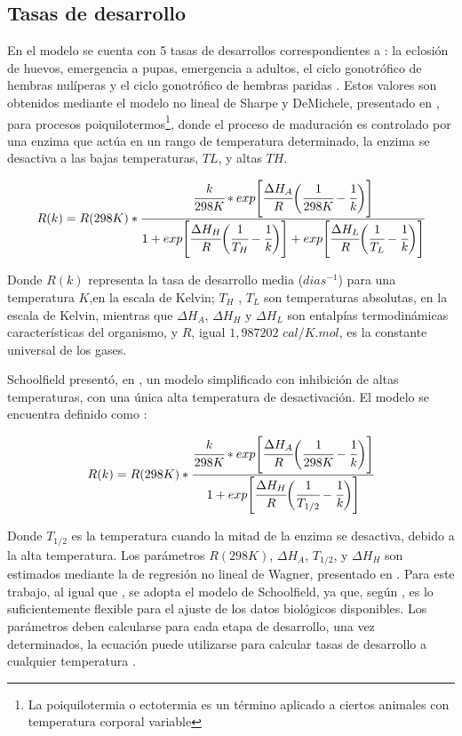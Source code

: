 \subsection{Tasas de desarrollo}
\label{subsec:cap4-tasas de desarrollo}
En el modelo se cuenta con 5 tasas de desarrollos correspondientes a : la eclosión de huevos,
emergencia a pupas, emergencia a adultos, el ciclo gonotrófico de hembras nulíperas y el ciclo gonotrófico de hembras paridas . Estos valores son obtenidos mediante el modelo no lineal de
Sharpe y DeMichele, presentado en \cite{sharpe1977reaction}, para procesos poiquilotermos\footnote{ La poiquilotermia o ectotermia es un término aplicado a ciertos animales con temperatura corporal
variable}, donde el proceso de maduración es controlado por una enzima que actúa en un rango de temperatura determinado, la enzima se desactiva a las bajas temperaturas, $TL$, y altas $TH$.

\begin{equation} \label{eq:sharpe-demichele}
   R(k)  = R(298K) *\cfrac{ \cfrac{k}{298K} *
    exp \Bigg[
            \cfrac{\Delta H_{A}}{R} \bigg(\cfrac{1}{298K} - \cfrac{1}{k}\bigg)
        \Bigg]}
    {1 + exp\Bigg[\cfrac{\Delta H_{H}}{R} \bigg(\cfrac{1}{T_{H}}- \cfrac{1}{k}\bigg)\Bigg] +  exp\Bigg[\cfrac{\Delta H_{L}}{R} \bigg(\cfrac{1}{T_{L}}- \cfrac{1}{k}\bigg)\Bigg]}
\end{equation}

Donde $R(k)$ representa la tasa de desarrollo media ($dias^{-1}$) para una temperatura $K$,en la
escala de Kelvin; $T_{H}$ , $T_{L}$ son temperaturas absolutas, en la escala de Kelvin, mientras
que $\Delta H_{A}$, $\Delta H_{H}$ y $\Delta H_{L}$ son entalpías termodinámicas características
del organismo, y $R$, igual $1,987202$ $cal/K.mol$, es la constante universal de los gases.

Schoolfield presentó, en \cite{schoolfield1981non}, un modelo simplificado con inhibición de altas
temperaturas, con una única alta temperatura de desactivación. El modelo se encuentra definido
como :

\begin{equation} \label{eq:schoolfield}
   R(k)  = R(298K) *\cfrac{ \cfrac{k}{298K} *
    exp \Bigg[
            \cfrac{\Delta H_{A}}{R} \bigg(\cfrac{1}{298K} - \cfrac{1}{k}\bigg)
        \Bigg]}
    {1 + exp\Bigg[\cfrac{\Delta H_{H}}{R} \bigg(\cfrac{1}{T_{1/2}}- \cfrac{1}{k}\bigg)\Bigg] }
\end{equation}

Donde $T_{1/2}$ es la temperatura cuando la mitad de la enzima se desactiva, debido a la alta
temperatura. Los parámetros $R(298K)$, $\Delta H_{A}$, $T_{1/2}$, y $\Delta H_{H}$ son estimados
mediante la de regresión no lineal de Wagner, presentado en \cite{wagner1984modeling}. Para este
trabajo, al igual que \cite{rueda1990temperature, otero2006stochastic}, se adopta el modelo de
Schoolfield, ya que, según \cite{otero2006stochastic}, es lo suficientemente flexible para el
ajuste de los datos biológicos disponibles. Los parámetros deben calcularse para cada etapa de
desarrollo, una vez determinados, la ecuación puede utilizarse para calcular tasas de desarrollo a
cualquier temperatura \cite{rueda1990temperature}.
